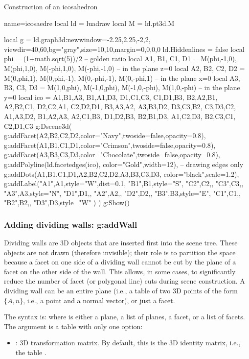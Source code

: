 \begin{demo}{Construction of an icosahedron}
\begin{luadraw}{name=icosaedre}
local ld = luadraw
local M = ld.pt3d.M

local g = ld.graph3d:new{window={-2.25,2.25,-2,2}, viewdir={40,60},bg="gray",size={10,10},margin={0,0,0,0}}
ld.Hiddenlines = false
local phi = (1+math.sqrt(5))/2 -- golden ratio
local A1, B1, C1, D1 = M(phi,-1,0), M(phi,1,0), M(-phi,1,0), M(-phi,-1,0) -- in the plane z=0
local A2, B2, C2, D2 = M(0,phi,1), M(0,phi,-1), M(0,-phi,-1), M(0,-phi,1) -- in the plane x=0
local A3, B3, C3, D3 = M(1,0,phi), M(-1,0,phi), M(-1,0,-phi), M(1,0,-phi) -- in the plane y=0
local ico = {
{A1,B1,A3}, {B1,A1,D3}, {D1,C1,C3}, {C1,D1,B3},
{B2,A2,B1}, {A2,B2,C1}, {D2,C2,A1}, {C2,D2,D1},
{B3,A3,A2}, {A3,B3,D2}, {D3,C3,B2}, {C3,D3,C2},
{A1,A3,D2}, {B1,A2,A3}, {A2,C1,B3}, {D1,D2,B3},
{B2,B1,D3}, {A1,C2,D3}, {B2,C3,C1}, {C2,D1,C3} }
g:Dscene3d(
    g:addFacet({A2,B2,C2,D2},{color="Navy",twoside=false,opacity=0.8}),
    g:addFacet({A1,B1,C1,D1},{color="Crimson",twoside=false,opacity=0.8}),
    g:addFacet({A3,B3,C3,D3},{color="Chocolate",twoside=false,opacity=0.8}),
    g:addPolyline(ld.facetedges(ico), {color="Gold",width=12}), -- drawing edges only
    g:addDots({A1,B1,C1,D1,A2,B2,C2,D2,A3,B3,C3,D3}, {color="black",scale=1.2}),
    g:addLabel("A1",A1,{style="W",dist=0.1}, "B1",B1,{style="S"}, "C2",C2,{}, "C3",C3,{},
        "A3",A3,{style="N"}, "D1",D1,{}, "A2",A2,{}, "D2",D2,{}, "B3",B3,{style="E"},
        "C1",C1,{}, "B2",B2,{}, "D3",D3,{style="W"} )
)
g:Show()
\end{luadraw}
\end{demo}

\subsubsection{Adding dividing walls: g:addWall}

Dividing walls are 3D objects that are inserted first into the scene tree. These objects are not drawn (therefore invisible); their role is to partition the space because a facet on one side of a dividing wall cannot be cut by the plane of a facet on the other side of the wall. This allows, in some cases, to significantly reduce the number of facet (or polygonal line) cuts during scene construction. A dividing wall can be an entire plane (i.e., a table of two 3D points of the form $\{A,n\}$, i.e., a point and a normal vector), or just a facet.

The syntax is:  where  is either a plane, a list of planes, a facet, or a list of facets. The  argument is a table with only one option:
\begin{itemize}
    \item {}: 3D transformation matrix. By default, this is the 3D identity matrix, i.e., the table .
\end{itemize}

